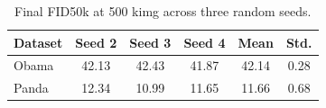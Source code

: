 \begin{table}[t]
\centering
\caption{Final FID50k at 500 kimg across three random seeds.}
\label{tab:baseline_final_fid}
\begin{tabular}{lccccc}
\hline
Dataset & Seed 2 & Seed 3 & Seed 4 & Mean & Std. \\
\hline
Obama & 42.13 & 42.43 & 41.87 & 42.14 & 0.28 \\
Panda & 12.34 & 10.99 & 11.65 & 11.66 & 0.68 \\
\hline
\end{tabular}
\end{table}
